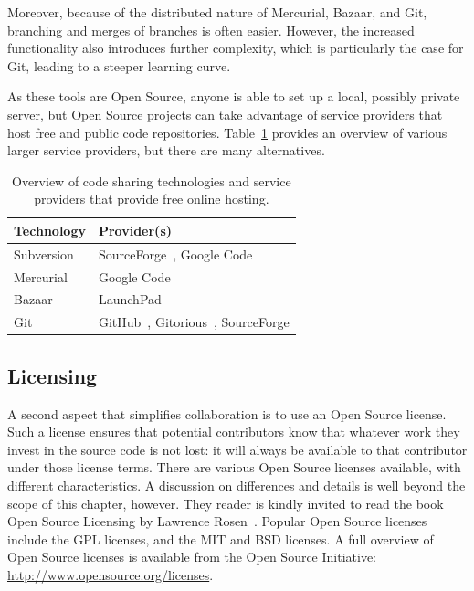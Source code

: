 \documentclass[11pt]{book}
\begin{document}
Moreover, because of the distributed nature of Mercurial, Bazaar, and Git,
branching and merges of branches is often easier. However, the increased
functionality also introduces further complexity, which is particularly
the case for Git, leading to a steeper learning curve.

As these tools are Open Source, anyone is able to set up a local,
possibly private server, but
Open Source projects can take advantage of service providers that host
free and public code repositories. Table~\ref{tab:cvsProviders}
provides an overview of various larger service providers, but there
are many alternatives.

\begin{table}
\caption{Overview of code sharing technologies and service providers
that provide free online hosting.}
\label{tab:cvsProviders}
\begin{center}
\begin{tabularx}{0.7\textwidth}{ll}
\toprule
\textbf{Technology} & \textbf{Provider(s)} \\
\midrule 
 Subversion & SourceForge~\cite{url:sourceforge}, Google Code~\cite{url:googlecode} \\ 
 Mercurial & Google Code \\ 
 Bazaar & LaunchPad~\cite{url:launchpad} \\ 
 Git & GitHub~\cite{url:github}, Gitorious~\cite{url:gitorious}, SourceForge \\ 
\bottomrule
\end{tabularx}
\end{center}
\end{table}

\subsection{Licensing}

A second aspect that simplifies collaboration is to use an
Open Source license. Such a license ensures that potential
contributors know that whatever work they invest in the source
code is not lost: it will always be available to that
contributor under those license terms.
There are various Open Source licenses available, with
different characteristics. A discussion on differences and
details is well beyond the scope of this chapter, however.
They reader is kindly invited to read the book
Open Source Licensing by Lawrence Rosen~\cite{Rosen2004}.
Popular Open Source licenses include the GPL
licenses, and the MIT and BSD licenses. A full overview of Open
Source licenses is available from the Open Source Initiative:
\url{http://www.opensource.org/licenses}.
\end{document}
